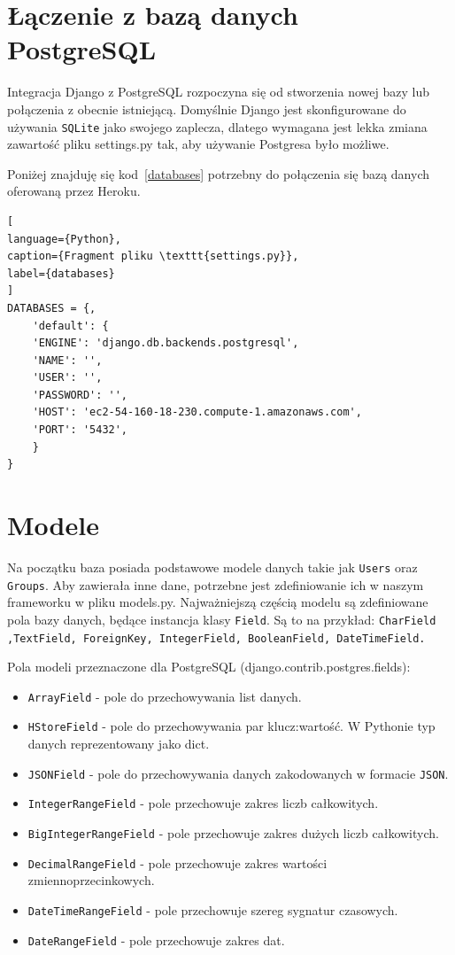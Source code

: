 \documentclass[oneside,polski,logo,indent]{amuthesis}
\begin{document}
\section{Łączenie z bazą danych PostgreSQL}
Integracja Django z PostgreSQL rozpoczyna się od stworzenia nowej bazy lub połączenia z obecnie istniejącą.
Domyślnie Django jest skonfigurowane do używania \texttt{SQLite} jako swojego zaplecza, dlatego wymagana jest lekka zmiana zawartość pliku settings.py tak, aby używanie Postgresa było możliwe. 

Poniżej znajduję się kod~\ref{databases} potrzebny do połączenia się bazą danych oferowaną przez Heroku. 
\begin{lstlisting}[
language={Python},
caption={Fragment pliku \texttt{settings.py}},
label={databases}
]
DATABASES = {,  
	'default': { 
	'ENGINE': 'django.db.backends.postgresql', 
	'NAME': '', 
	'USER': '', 
	'PASSWORD': '', 
	'HOST': 'ec2-54-160-18-230.compute-1.amazonaws.com', 
	'PORT': '5432', 
	} 
} 
\end{lstlisting}
\section{Modele}

Na początku baza posiada podstawowe modele danych takie jak  \texttt{Users} oraz \texttt{Groups}. Aby zawierała inne dane, potrzebne jest zdefiniowanie ich w naszym frameworku w pliku models.py.
Najważniejszą częścią modelu są zdefiniowane pola bazy danych, będące instancja klasy \texttt{Field}. Są to na przykład:  \texttt{CharField ,TextField, ForeignKey, IntegerField, BooleanField, DateTimeField.}

Pola modeli przeznaczone dla PostgreSQL (django.contrib.postgres.fields):
\begin{itemize}
	\item \texttt{ArrayField} - pole do przechowywania list danych.
	\item \texttt{HStoreField} - pole do przechowywania par klucz:wartość. W Pythonie typ danych reprezentowany jako dict.
	\item \texttt{JSONField} - pole do przechowywania danych zakodowanych w formacie \texttt{JSON}.
	\item \texttt{IntegerRangeField} - pole przechowuje zakres liczb całkowitych.
	\item \texttt{BigIntegerRangeField} - pole przechowuje zakres dużych liczb całkowitych.
	\item \texttt{DecimalRangeField} - pole przechowuje zakres wartości zmiennoprzecinkowych.
	\item \texttt{DateTimeRangeField} - pole przechowuje szereg sygnatur czasowych.
	\item \texttt{DateRangeField} - pole przechowuje zakres dat.
\end{itemize}
\end{document}
